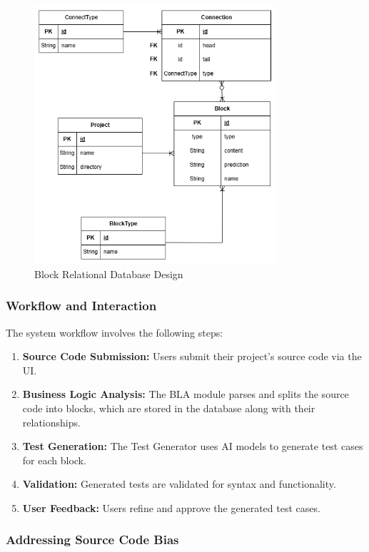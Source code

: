 \begin{figure}[H]
	\centering
	\includegraphics[width=0.8\textwidth]{images/DB block design.drawio.png}
	\caption{Block Relational Database Design}
	\label{fig:block-erd}
\end{figure}

\subsubsection{Workflow and Interaction}

The system workflow involves the following steps:
\begin{enumerate}
    \item \textbf{Source Code Submission:} Users submit their project's source code via the UI.
    \item \textbf{Business Logic Analysis:} The BLA module parses and splits the source code into blocks, which are stored in the database along with their relationships.
    \item \textbf{Test Generation:} The Test Generator uses AI models to generate test cases for each block.
    \item \textbf{Validation:} Generated tests are validated for syntax and functionality.
    \item \textbf{User Feedback:} Users refine and approve the generated test cases.
\end{enumerate}

\subsubsection{Addressing Source Code Bias}

